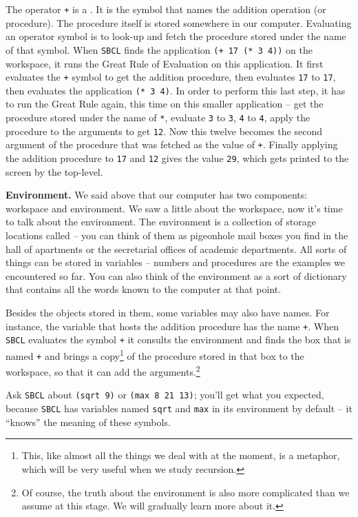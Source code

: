 \documentclass[a4paper,11pt]{article}
\begin{document}
\begin{uenum}
The operator \Verb-+- is a . It is the symbol that names the addition operation (or procedure). The procedure itself is stored somewhere in our computer. Evaluating an operator symbol is to look-up and fetch the procedure stored under the name of that symbol. When \Verb+SBCL+ finds the application \Verb-(+ 17 (* 3 4))- on the workspace, it runs the Great Rule of Evaluation on this application. It first evaluates the \Verb-+- symbol to get the addition procedure, then evaluates \Verb+17+ to \Verb+17+, then evaluates the application \Verb+(* 3 4)+. In order to perform this last step, it has to run the Great Rule again, this time on this smaller application -- get the procedure stored under the name of \Verb+*+, evaluate \Verb+3+ to \Verb+3+, \Verb+4+ to \Verb+4+, apply the procedure to the arguments to get \Verb+12+. Now this twelve becomes the second argument of the procedure that was fetched as the value of \Verb-+-. Finally applying the addition procedure to \Verb+17+ and \Verb+12+ gives the value \Verb+29+, which gets printed to the screen by the top-level. 

\item {\bf Environment.} We said above that our computer has two components: workspace and environment. We saw a little about the workspace, now it's time to talk about the environment. The environment is a collection of storage locations called  -- you can think of them as pigeonhole mail boxes you find in the hall of apartments or the secretarial offices of academic departments. All sorts of things can be stored in variables -- numbers and procedures are the examples we encountered so far. You can also think of the environment as a sort of dictionary that contains all the words known to the computer at that point.

Besides the objects stored in them, some variables may also have names. For instance, the variable that hosts the addition procedure has the name \Verb-+-. When \Verb+SBCL+ evaluates the symbol \Verb-+- it consults the environment and finds the box that is named \Verb-+- and brings a copy\footnote{This, like almost all the things we deal with at the moment, is a metaphor, which will be very useful when we study recursion.} of the procedure stored in that box to the workspace, so that it can add the arguments.\footnote{Of course, the truth about the environment is also more complicated than we assume at this stage. We will gradually learn more about it.}

Ask \Verb+SBCL+ about \Verb+(sqrt 9)+ or \Verb+(max 8 21 13)+; you'll get what you expected, because \Verb+SBCL+ has variables named \Verb+sqrt+ and \Verb+max+ in its environment by default -- it ``knows'' the meaning of these symbols. 


\end{uenum}
\end{document}
